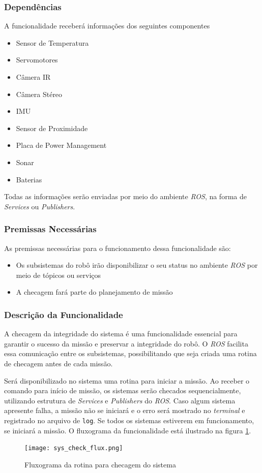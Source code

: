 \subsubsection{Dependências}
A funcionalidade receberá informações dos seguintes componentes
\begin{itemize}
	\item Sensor de Temperatura
	\item Servomotores
	\item Câmera IR
	\item Câmera Stéreo
	\item IMU
	\item Sensor de Proximidade
	\item Placa de Power Management
	\item Sonar 
	\item Baterias
\end{itemize}

Todas as informações serão enviadas por meio do ambiente \textit{ROS}, na forma de \textit{Services} ou \textit{Publishers}.

\subsubsection{Premissas Necessárias}
As premissas necessárias para o funcionamento dessa funcionalidade são:
\begin{itemize}
	\item Os subsistemas do robô irão disponibilizar o seu status no ambiente \textit{ROS} por meio de tópicos ou serviços
	\item A checagem fará parte do planejamento de missão
\end{itemize}

\subsubsection{Descrição da Funcionalidade}
A checagem da integridade do sistema é uma funcionalidade essencial para garantir o sucesso da missão e preservar a integridade do robô. O \textit{ROS} facilita essa comunicação entre os subsistemas, possibilitando que seja criada uma rotina de checagem antes de cada missão.

Será disponibilizado no sistema uma rotina para iniciar a missão. Ao receber o comando para início de missão, os sistemas serão checados sequencialmente, utilizando estrutura de \textit{Services} e \textit{Publishers} do \textit{ROS}. Caso algum sistema apresente falha, a missão não se iniciará e o erro será mostrado no \textit{terminal} e registrado no arquivo de \verb|log|. Se todos os sistemas estiverem em funcionamento, se iniciará a missão. O fluxograma da funcionalidade está ilustrado na figura \ref{fig:sys_check_flux}.	
\begin{figure}[h]
	\centering
	\texttt{[image: sys\_check\_flux.png]}
	\caption{Fluxograma da rotina para checagem do sistema}
	\label{fig:sys_check_flux}
\end{figure} 


